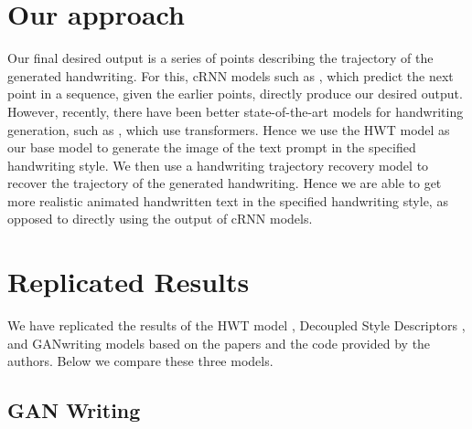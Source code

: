 \documentclass[10pt,twocolumn,letterpaper]{article}
\begin{document}
\section{Our approach}
Our final desired output is a series of points describing the trajectory of the generated handwriting. For this, cRNN models such as \cite{crnn,BRUSH-paper}, which predict the next point in a sequence, given the earlier points, directly produce our desired output. However, recently, there have been better state-of-the-art models for handwriting generation, such as \cite{HWT}, which use transformers. Hence we use the HWT model\cite{HWT} as our base model to generate the image of the text prompt in the specified handwriting style. We then use a handwriting trajectory recovery model \cite{image2stroke-1Char,img2stroke-multichar} to recover the trajectory of the generated handwriting. Hence we are able to get more realistic animated handwritten text in the specified handwriting style, as opposed to directly using the output of cRNN models.\\

\section{Replicated Results}
We have replicated the results of the HWT model \cite{HWT}, Decoupled Style Descriptors \cite{BRUSH-paper}, and GANwriting \cite{GAN-1} models based on the papers and the code provided by the authors. Below we compare these three models.

\subsection*{GAN Writing}
\end{document}

